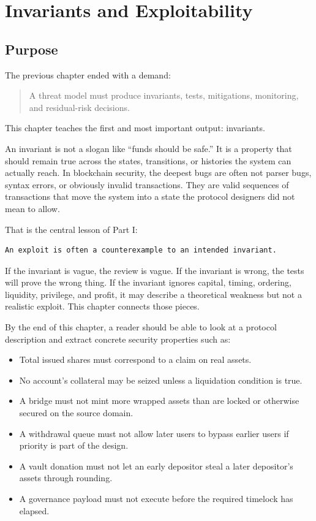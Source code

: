 \chapter{Invariants and Exploitability}

\section{Purpose}

The previous chapter ended with a demand:

\begin{quote}
A threat model must produce invariants, tests, mitigations, monitoring,
and residual-risk decisions.
\end{quote}

This chapter teaches the first and most important output: invariants.

An invariant is not a slogan like ``funds should be safe.'' It is a
property that should remain true across the states, transitions, or
histories the system can actually reach. In blockchain security, the
deepest bugs are often not parser bugs, syntax errors, or obviously
invalid transactions. They are valid sequences of transactions that move
the system into a state the protocol designers did not mean to allow.

That is the central lesson of Part I:

\begin{lstlisting}
An exploit is often a counterexample to an intended invariant.
\end{lstlisting}

If the invariant is vague, the review is vague. If the invariant is
wrong, the tests will prove the wrong thing. If the invariant ignores
capital, timing, ordering, liquidity, privilege, and profit, it may
describe a theoretical weakness but not a realistic exploit. This
chapter connects those pieces.

By the end of this chapter, a reader should be able to look at a
protocol description and extract concrete security properties such as:

\begin{itemize}
\tightlist
\item
  Total issued shares must correspond to a claim on real assets.
\item
  No account's collateral may be seized unless a liquidation condition
  is true.
\item
  A bridge must not mint more wrapped assets than are locked or
  otherwise secured on the source domain.
\item
  A withdrawal queue must not allow later users to bypass earlier users
  if priority is part of the design.
\item
  A vault donation must not let an early depositor steal a later
  depositor's assets through rounding.
\item
  A governance payload must not execute before the required timelock has
  elapsed.
\end{itemize}

